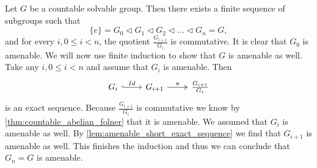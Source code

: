 Let $G$ be a countable solvable group. Then there exists a finite sequence of subgroups such that 
$$\{e\} = G_0 \triangleleft G_1 \triangleleft G_2 \triangleleft \dots \triangleleft G_n = G,$$ and for every $i, 0\le i<n$, the quotient $\frac{G_{i+1}}{G_i}$ is commutative. 
It is clear that $G_0$ is amenable. We will now use finite induction to show that $G$ is amenable as well. 
Take any $i, 0\le i<n$ and assume that $G_i$ is amenable. Then 
\[\begin{tikzcd}
    G_i \arrow[r, "Id", hook] & G_{i+1} \arrow[r, "\pi", two heads] & \frac{G_{i+1}}{G_i}
    \end{tikzcd}\]
is an exact sequence. Because $\frac{G_{i+1}}{G_i}$ is commutative we know by \cref{thm:countable_abelian_folner} that it is amenable. We assumed that $G_i$ is amenable as well. By \cref{lem:amenable_short_exact_sequence} we find that $G_{i+1}$ is amenable as well. This finishes the induction and thus we can conclude that $G_n = G$ is amenable.
